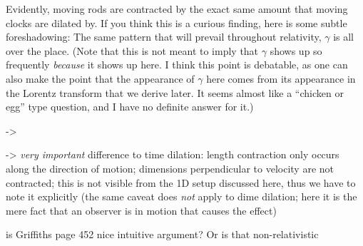 \documentclass[../relativity_main.tex]{subfiles}
\begin{document}
Evidently, moving rods are contracted by the exact same amount that moving clocks are dilated by. If you think this is a curious finding, here is some subtle foreshadowing: The same pattern that will prevail throughout relativity, $\gamma$ is all over the place. (Note that this is not meant to imply that $\gamma$ shows up so frequently \emph{because} it shows up here. I think this point is debatable, as one can also make the point that the appearance of $\gamma$ here comes from its appearance in the Lorentz transform that we derive later. It seems almost like a \enquote{chicken or egg} type question, and I have no definite answer for it.)%


-> 



-> \emph{very important} difference to time dilation: length contraction only occurs along the direction of motion; dimensions perpendicular to velocity are not contracted; this is not visible from the 1D setup discussed here, thus we have to note it explicitly (the same caveat does \emph{not} apply to dime dilation; here it is the mere fact that an observer is in motion that causes the effect)



is Griffiths page 452 nice intuitive argument? Or is that non-relativistic
\end{document}
